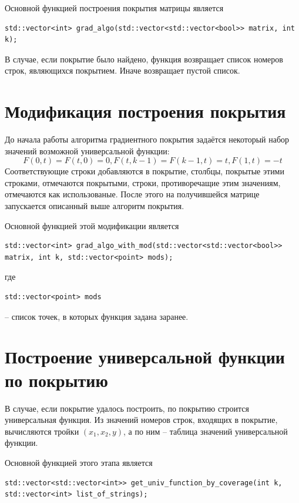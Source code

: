 \documentclass[oneside,final,14pt]{extreport}
\begin{document}
Основной функцией построения покрытия матрицы является

\begin{lstlisting}
std::vector<int> grad_algo(std::vector<std::vector<bool>> matrix, int k);
\end{lstlisting}

В случае, если покрытие было найдено, функция возвращает список номеров строк, являющихся покрытием. 
Иначе возвращает пустой список.

\section{Модификация построения покрытия}

До начала работы алгоритма градиентного покрытия задаётся некоторый набор значений возможной универсальной функции: 
\[F(0, t) = F(t, 0) = 0, F(t, k-1) = F(k-1, t) = t, F(1, t) = -t\]
Соответствующие строки добавляются в покрытие, столбцы, покрытые этими строками, отмечаются покрытыми, 
строки, противоречащие этим значениям, отмечаются как использованые.
После этого на получившейся матрице запускается описанный выше алгоритм покрытия.

Основной функцией этой модификации является

\begin{lstlisting}
std::vector<int> grad_algo_with_mod(std::vector<std::vector<bool>> matrix, int k, std::vector<point> mods);
\end{lstlisting}

где 
\begin{lstlisting} 
std::vector<point> mods 
\end{lstlisting} 
-- список точек, в которых функция задана заранее.

\section{Построение универсальной функции по покрытию}

В случае, если покрытие удалось построить, по покрытию строится универсальная функция. Из значений номеров строк, входящих в 
покрытие, вычисляются тройки \((x_1, x_2, y)\), а по ним -- таблица значений универсальной функции.

Основной функцией этого этапа является

\begin{lstlisting}
std::vector<std::vector<int>> get_univ_function_by_coverage(int k, std::vector<int> list_of_strings);
\end{lstlisting}
\end{document}
